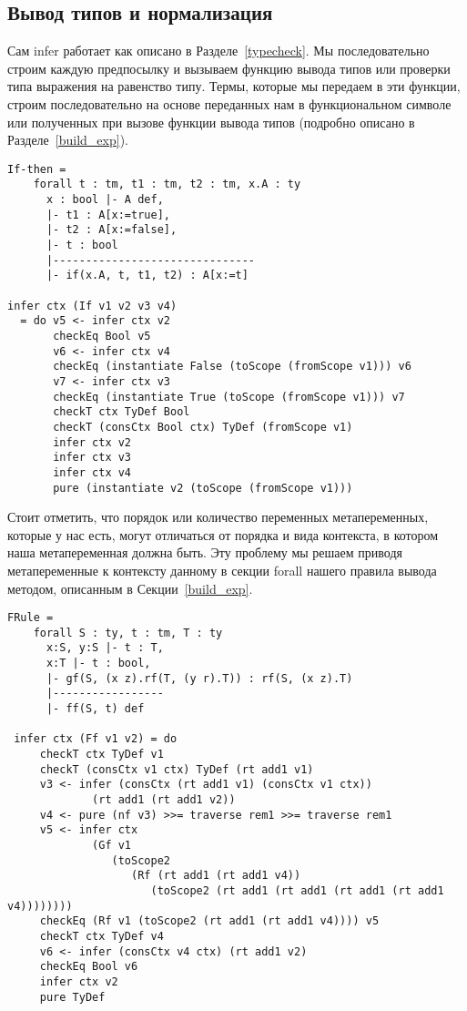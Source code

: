 \pagebreak
\subsection{Вывод типов и нормализация}\label{nf_infer}
Сам infer работает как описано в Разделе~\ref{typecheck}. Мы последовательно строим каждую предпосылку и вызываем функцию вывода типов или проверки типа выражения на равенство типу. Термы, которые мы передаем в эти функции, строим последовательно на основе переданных нам в функциональном символе или полученных при вызове функции вывода типов (подробно описано в Разделе~\ref{build_exp}).

\begin{lstlisting}[caption={Пример правила вывода и части сгенерированной функции infer, соответствующей этому правилу},captionpos=b, frame=single, float, floatplacement=H]
If-then =
    forall t : tm, t1 : tm, t2 : tm, x.A : ty
      x : bool |- A def,
      |- t1 : A[x:=true],
      |- t2 : A[x:=false],
      |- t : bool
      |-------------------------------
      |- if(x.A, t, t1, t2) : A[x:=t]

infer ctx (If v1 v2 v3 v4)
  = do v5 <- infer ctx v2
       checkEq Bool v5
       v6 <- infer ctx v4
       checkEq (instantiate False (toScope (fromScope v1))) v6
       v7 <- infer ctx v3
       checkEq (instantiate True (toScope (fromScope v1))) v7
       checkT ctx TyDef Bool
       checkT (consCtx Bool ctx) TyDef (fromScope v1)
       infer ctx v2
       infer ctx v3
       infer ctx v4
       pure (instantiate v2 (toScope (fromScope v1)))
\end{lstlisting}

Стоит отметить, что порядок или количество переменных метапеременных, которые у нас есть, могут отличаться от порядка и вида контекста, в котором наша метапеременная должна быть. Эту проблему мы решаем приводя метапеременные к контексту данному в секции forall нашего правила вывода методом, описанным в Секции~\ref{build_exp}.


\begin{lstlisting}[caption={Искусственный пример случая несоответствия контекстов: контекст t нужно сократить до использования в предпосылке.},label={FRule},captionpos=b, frame=single, float, floatplacement=H]
FRule =
    forall S : ty, t : tm, T : ty
      x:S, y:S |- t : T,
      x:T |- t : bool,
      |- gf(S, (x z).rf(T, (y r).T)) : rf(S, (x z).T)
      |-----------------
      |- ff(S, t) def

 infer ctx (Ff v1 v2) = do
     checkT ctx TyDef v1
     checkT (consCtx v1 ctx) TyDef (rt add1 v1)
     v3 <- infer (consCtx (rt add1 v1) (consCtx v1 ctx))
             (rt add1 (rt add1 v2))
     v4 <- pure (nf v3) >>= traverse rem1 >>= traverse rem1
     v5 <- infer ctx
             (Gf v1
                (toScope2
                   (Rf (rt add1 (rt add1 v4))
                      (toScope2 (rt add1 (rt add1 (rt add1 (rt add1 v4))))))))
     checkEq (Rf v1 (toScope2 (rt add1 (rt add1 v4)))) v5
     checkT ctx TyDef v4
     v6 <- infer (consCtx v4 ctx) (rt add1 v2)
     checkEq Bool v6
     infer ctx v2
     pure TyDef
\end{lstlisting}



